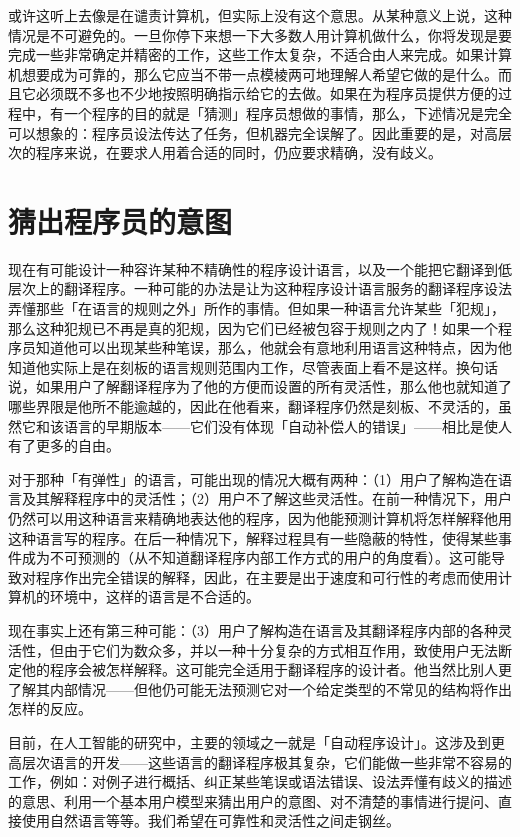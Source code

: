 \documentclass[
  12pt,
  twoside,
  openright,
  oldfontcommands,
]{memoir}
\begin{document}
或许这听上去像是在谴责计算机，但实际上没有这个意思。从某种意义上说，这种情况是不可避免的。一旦你停下来想一下大多数人用计算机做什么，你将发现是要完成一些非常确定并精密的工作，这些工作太复杂，不适合由人来完成。如果计算机想要成为可靠的，那么它应当不带一点模棱两可地理解人希望它做的是什么。而且它必须既不多也不少地按照明确指示给它的去做。如果在为程序员提供方便的过程中，有一个程序的目的就是「猜测」程序员想做的事情，那么，下述情况是完全可以想象的：程序员设法传达了任务，但机器完全误解了。因此重要的是，对高层次的程序来说，在要求人用着合适的同时，仍应要求精确，没有歧义。

\section{猜出程序员的意图}

现在有可能设计一种容许某种不精确性的程序设计语言，以及一个能把它翻译到低层次上的翻译程序。一种可能的办法是让为这种程序设计语言服务的翻译程序设法弄懂那些「在语言的规则之外」所作的事情。但如果一种语言允许某些「犯规」，那么这种犯规已不再是真的犯规，因为它们已经被包容于规则之内了！如果一个程序员知道他可以出现某些种笔误，那么，他就会有意地利用语言这种特点，因为他知道他实际上是在刻板的语言规则范围内工作，尽管表面上看不是这样。换句话说，如果用户了解翻译程序为了他的方便而设置的所有灵活性，那么他也就知道了哪些界限是他所不能逾越的，因此在他看来，翻译程序仍然是刻板、不灵活的，虽然它和该语言的早期版本------它们没有体现「自动补偿人的错误」------相比是使人有了更多的自由。

对于那种「有弹性」的语言，可能出现的情况大概有两种：（1）用户了解构造在语言及其解释程序中的灵活性；（2）用户不了解这些灵活性。在前一种情况下，用户仍然可以用这种语言来精确地表达他的程序，因为他能预测计算机将怎样解释他用这种语言写的程序。在后一种情况下，解释过程具有一些隐蔽的特性，使得某些事件成为不可预测的（从不知道翻译程序内部工作方式的用户的角度看）。这可能导致对程序作出完全错误的解释，因此，在主要是出于速度和可行性的考虑而使用计算机的环境中，这样的语言是不合适的。

现在事实上还有第三种可能：（3）用户了解构造在语言及其翻译程序内部的各种灵活性，但由于它们为数众多，并以一种十分复杂的方式相互作用，致使用户无法断定他的程序会被怎样解释。这可能完全适用于翻译程序的设计者。他当然比别人更了解其内部情况------但他仍可能无法预测它对一个给定类型的不常见的结构将作出怎样的反应。

目前，在人工智能的研究中，主要的领域之一就是「自动程序设计」。这涉及到更高层次语言的开发------这些语言的翻译程序极其复杂，它们能做一些非常不容易的工作，例如：对例子进行概括、纠正某些笔误或语法错误、设法弄懂有歧义的描述的意思、利用一个基本用户模型来猜出用户的意图、对不清楚的事情进行提问、直接使用自然语言等等。我们希望在可靠性和灵活性之间走钢丝。
\end{document}
